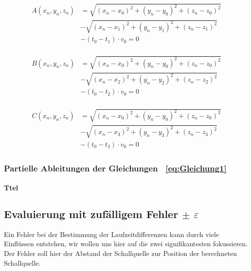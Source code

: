 \begin{align}
\begin{split}
A(x_{n},y_{n},z_{n})  &=  \sqrt{(x_{n}- x_{0})^{2} + (y_{n} - y_{0})^{2} + (z_{n} - z_{0})^{2}} \\& - \sqrt{(x_{n}- x_{1})^{2} + (y_{n} - y_{1})^{2} + (z_{n} - z_{1})^{2}} \\ & - (t_{0} - t_{1}) \cdot v_{0} = 0\label{Gleichung1}
\end{split}
\end{align}

\begin{align}
\begin{split}
B(x_{n},y_{n},z_{n})  &=  \sqrt{(x_{n}- x_{0})^{2} + (y_{n} - y_{0})^{2} + (z_{n} - z_{0})^{2}} \\& - \sqrt{(x_{n}- x_{2})^{2} + (y_{n} - y_{2})^{2} + (z_{n} - z_{2})^{2}} \\ & - (t_{0} - t_{2}) \cdot v_{0} = 0
\end{split}
\end{align}

\begin{align}
\begin{split}
C(x_{n},y_{n},z_{n})  &=  \sqrt{(x_{n}- x_{0})^{2} + (y_{n} - y_{0})^{2} + (z_{n} - z_{0})^{2}} \\& - \sqrt{(x_{n}- x_{3})^{2} + (y_{n} - y_{3})^{2} + (z_{n} - z_{3})^{2}} \\ & - (t_{0} - t_{3}) \cdot v_{0} = 0\label{eq:Gleichung3}
\end{split}
\end{align}

\subsubsection{Partielle Ableitungen der Gleichungen ~\eqref{eq:Gleichung1}}
\paragraph{Ttel}







\subsection{Evaluierung mit zufälligem Fehler $\pm$ $\varepsilon$ }
Ein Fehler bei der Bestimmung der Laufzeitdifferenzen kann durch viele Einflüssen entstehen, wir wollen uns hier auf die zwei signifikantesten fokussieren. Der Fehler soll hier der Abstand der Schallquelle zur Position der berechneten Schallquelle.
